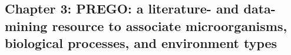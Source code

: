 \documentclass{beamer}
\begin{document}






   \begin{darkframes}
      \section{
         \textbf{Chapter 3:} PREGO: a literature- and data-mining
         resource to associate microorganisms,
         biological processes, and
         environment types
      }
   \end{darkframes}
\end{document}
